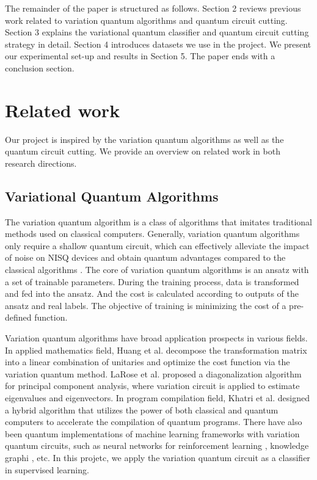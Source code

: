 \documentclass[sigconf]{acmart}
\begin{document}
The remainder of the paper is structured as follows. Section 2 reviews previous work related to variation quantum algorithms and quantum circuit cutting. Section 3 explains the variational quantum classifier and quantum circuit cutting strategy in detail. Section 4 introduces datasets we use in the project. We present our experimental set-up and results in Section 5. The paper ends with a conclusion section.

\section{Related work}

Our project is inspired by the variation quantum algorithms as well as the quantum circuit cutting. We provide an overview on related work in both research directions.

\subsection{Variational Quantum Algorithms}
The variation quantum algorithm is a class of algorithms that imitates traditional methods used on classical computers. Generally, variation quantum algorithms only require a shallow quantum circuit, which can effectively alleviate the impact of noise on NISQ devices and obtain quantum advantages compared to the classical algorithms \cite{cerezo2021}. The core of variation quantum algorithms is an ansatz with a set of trainable parameters. During the training process, data is transformed and fed into the ansatz. And the cost is calculated according to outputs of the ansatz and real labels. The objective of training is minimizing the cost of a pre-defined function.

Variation quantum algorithms have broad application prospects in various fields. In applied mathematics field, Huang et al. \cite{vqa-huang} decompose the transformation matrix into a linear combination of unitaries and optimize the cost function via the variation quantum method. LaRose et al. \cite{vqa-larose} proposed a diagonalization algorithm for principal component analysis, where variation circuit is applied to estimate eigenvalues and eigenvectors. In program compilation field, Khatri et al. \cite{vqa-qc} designed a hybrid algorithm that utilizes the power of both classical and quantum computers to accelerate the compilation of quantum programs. There have also been quantum implementations of machine learning frameworks with variation quantum circuits, such as neural networks for reinforcement learning \cite{vqa-rl}, knowledge graphi \cite{vqa-kg}, etc. In this projetc, we apply the variation quantum circuit as a classifier in supervised learning.
\end{document}
